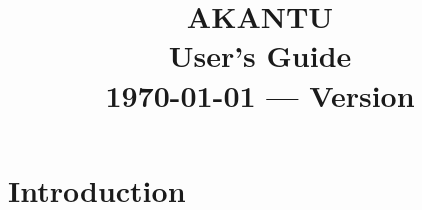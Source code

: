 \documentclass[a4paper,11pt]{book}
\title{\textbf{\Huge AKANTU}\\
  \vspace{0.5cm}
  \textbf{\huge User's Guide}\\
  \vspace{1cm}
  {\small \today{} --- Version \version}
}
\date{}
\newcommand{\code}[1]{\texttt{#1}}
\begin{document}
\maketitle

\tableofcontents

\chapter{Introduction}







\end{document}
